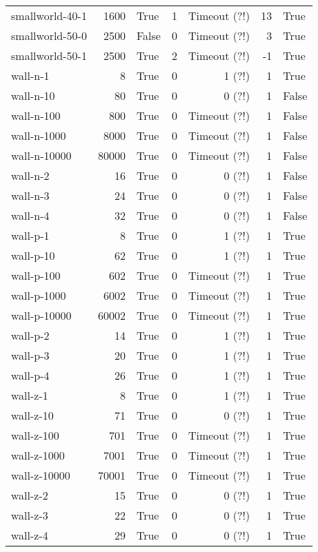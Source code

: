 \begin{longtable}{lrlrrrl}
smallworld-40-1 & 1600 & True & 1 & Timeout (?!) & 13 & True \\
smallworld-50-0 & 2500 & False & 0 & Timeout (?!) & 3 & True \\
smallworld-50-1 & 2500 & True & 2 & Timeout (?!) & -1 & True \\
wall-n-1 & 8 & True & 0 & 1 (?!) & 1 & True \\
wall-n-10 & 80 & True & 0 & 0 (?!) & 1 & False \\
wall-n-100 & 800 & True & 0 & Timeout (?!) & 1 & False \\
wall-n-1000 & 8000 & True & 0 & Timeout (?!) & 1 & False \\
wall-n-10000 & 80000 & True & 0 & Timeout (?!) & 1 & False \\
wall-n-2 & 16 & True & 0 & 0 (?!) & 1 & False \\
wall-n-3 & 24 & True & 0 & 0 (?!) & 1 & False \\
wall-n-4 & 32 & True & 0 & 0 (?!) & 1 & False \\
wall-p-1 & 8 & True & 0 & 1 (?!) & 1 & True \\
wall-p-10 & 62 & True & 0 & 1 (?!) & 1 & True \\
wall-p-100 & 602 & True & 0 & Timeout (?!) & 1 & True \\
wall-p-1000 & 6002 & True & 0 & Timeout (?!) & 1 & True \\
wall-p-10000 & 60002 & True & 0 & Timeout (?!) & 1 & True \\
wall-p-2 & 14 & True & 0 & 1 (?!) & 1 & True \\
wall-p-3 & 20 & True & 0 & 1 (?!) & 1 & True \\
wall-p-4 & 26 & True & 0 & 1 (?!) & 1 & True \\
wall-z-1 & 8 & True & 0 & 1 (?!) & 1 & True \\
wall-z-10 & 71 & True & 0 & 0 (?!) & 1 & True \\
wall-z-100 & 701 & True & 0 & Timeout (?!) & 1 & True \\
wall-z-1000 & 7001 & True & 0 & Timeout (?!) & 1 & True \\
wall-z-10000 & 70001 & True & 0 & Timeout (?!) & 1 & True \\
wall-z-2 & 15 & True & 0 & 0 (?!) & 1 & True \\
wall-z-3 & 22 & True & 0 & 0 (?!) & 1 & True \\
wall-z-4 & 29 & True & 0 & 0 (?!) & 1 & True \\
\end{longtable}